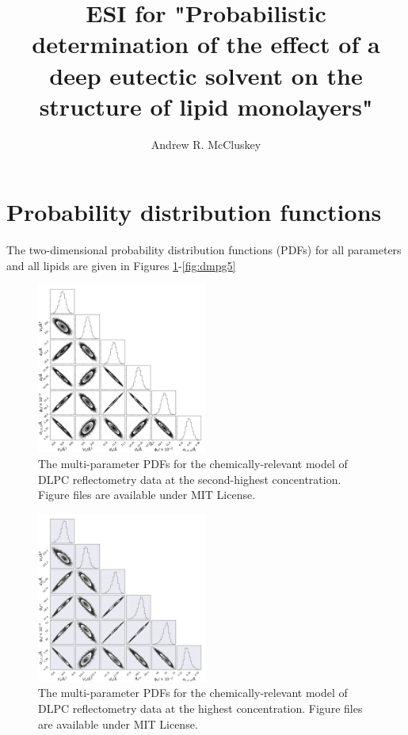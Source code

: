 \documentclass[11pt,a4paper]{article}
\author{Andrew R. McCluskey}
\title{ESI for "Probabilistic determination of the effect of a deep eutectic solvent on the structure of lipid monolayers"}
\begin{document}
	
\section{Probability distribution functions}

The two-dimensional probability distribution functions (PDFs) for all parameters and all lipids are given in Figures \ref{fig:dlpc4}-\ref{fig:dmpg5}
\begin{figure}[h]
	\centering
	\includegraphics[width=0.50\textwidth]{figures/dlpc4_all_corner}
	\caption{The multi-parameter PDFs for the chemically-relevant model of DLPC reflectometry data at the second-highest concentration. Figure files are available under MIT License.\cite{mccluskey_2018}}
	\label{fig:dlpc4}
\end{figure}
\begin{figure}
	\centering
	\includegraphics[width=0.50\textwidth]{figures/dlpc5_all_corner}
	\caption{The multi-parameter PDFs for the chemically-relevant model of DLPC reflectometry data at the highest concentration. Figure files are available under MIT License.\cite{mccluskey_2018}}
	\label{fig:dlpc5}
\end{figure}
\end{document}
